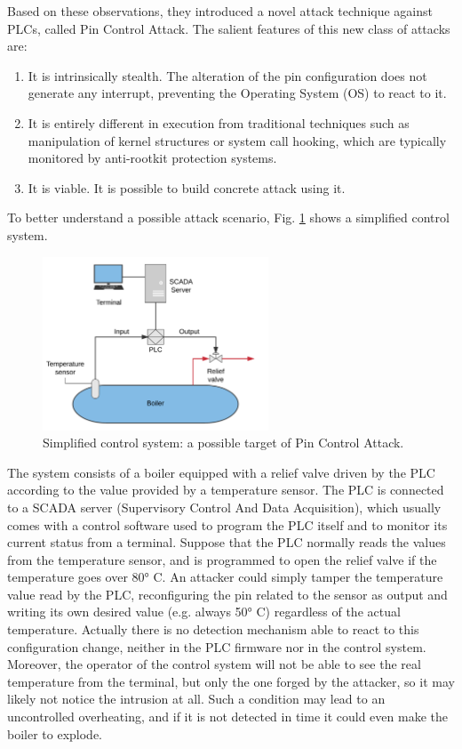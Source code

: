 Based on these observations, they introduced a novel attack technique against PLCs, called Pin Control Attack.
The salient features of this new class of attacks are:
\begin{enumerate}
	\item It is intrinsically stealth. The alteration of the pin configuration does not generate any interrupt, preventing the Operating System (OS) to react to it.
	\item It is entirely different in execution from traditional techniques such as manipulation of kernel structures or system call hooking, which are typically
		monitored by anti-rootkit protection systems.
	\item It is viable. It is possible to build concrete attack using it.
\end{enumerate}

To better understand a possible attack scenario, Fig. \ref{fig:control} shows a simplified control system.
\begin{figure}[h]
\centerline{\includegraphics[width=0.6\textwidth]{res/control}}
\caption{Simplified control system: a possible target of Pin Control Attack.\label{fig:control}}
\end{figure}
The system consists of a boiler equipped with a relief valve driven by the PLC according to the value provided by a temperature sensor.
The PLC is connected to a SCADA server (Supervisory Control And Data Acquisition), which usually comes with a control software used to program the PLC itself
and to monitor its current status from a terminal.
Suppose that the PLC normally reads the values from the temperature sensor, and is programmed to open the relief valve if the temperature goes over 80° C.
An attacker could simply tamper the temperature value read by the PLC, reconfiguring the pin related to the sensor as output and writing its own desired value
(e.g. always 50° C) regardless of the actual temperature.
Actually there is no detection mechanism able to react to this configuration change, neither in the PLC firmware nor in the control system.
Moreover, the operator of the control system will not be able to see the real temperature from the terminal, but only the one forged by the attacker,
so it may likely not notice the intrusion at all.
Such a condition may lead to an uncontrolled overheating, and if it is not detected in time it could even make the boiler to explode.


